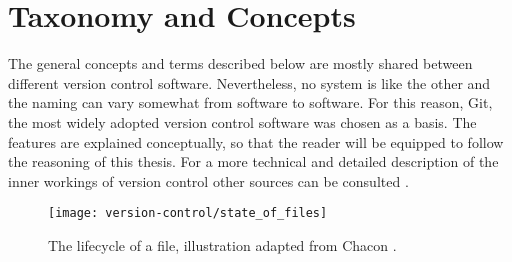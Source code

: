 \section{Taxonomy and Concepts}
The general concepts and terms described below are mostly shared between different version control software. Nevertheless, no system is like the other and the naming can vary somewhat from software to software. For this reason, Git, the most widely adopted version control software \cite{_stack_2015} was chosen as a basis. The features are explained conceptually, so that the reader will be equipped to follow the reasoning of this thesis. For a more technical and detailed description of the inner workings of version control other sources can be consulted \cite{baudis_current_2009,chacon_pro_2009,pilato_version_2008}.

\begin{figure}
 \centering
 \texttt{[image: version-control/state\_of\_files]}
 \caption{The lifecycle of a file, illustration adapted from Chacon \cite[p.~45]{chacon_pro_2009}.}
 \label{fig:file-state}
\end{figure}

